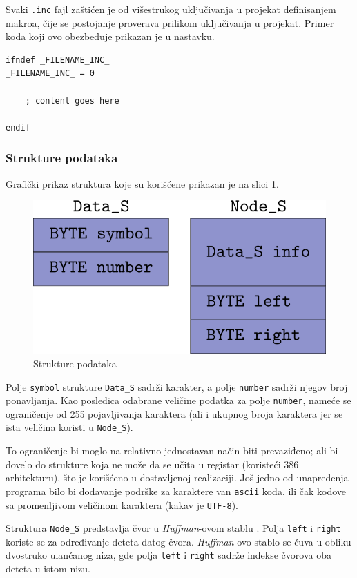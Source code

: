 \documentclass[a4paper, 12pt]{article}
\newcommand{\Huff}{\emph{Huffman}}
\begin{document}
Svaki \verb|.inc| fajl zaštićen je od višestrukog uključivanja u projekat definisanjem makroa, čije se postojanje proverava prilikom uključivanja u projekat.
Primer koda koji ovo obezbeđuje prikazan je u nastavku.

\begin{verbatim}
ifndef _FILENAME_INC_
_FILENAME_INC_ = 0

	; content goes here
	
endif
\end{verbatim}

\subsubsection*{Strukture podataka}

Grafički prikaz struktura koje su korišćene prikazan je na slici \ref{struct}. 

\begin{figure}[h!]
\centering
\includegraphics[width=.5\textwidth]{structures}
\caption{Strukture podataka}
\label{struct}
\end{figure}

Polje \verb|symbol| strukture \verb|Data_S| sadrži karakter, a polje \verb|number| sadrži njegov broj ponavljanja. 
Kao posledica odabrane veličine podatka za polje \verb|number|, nameće se ograničenje od 255 pojavljivanja karaktera (ali i ukupnog broja karaktera jer se ista veličina koristi u \verb|Node_S|).

To ograničenje bi moglo na relativno jednostavan način biti prevaziđeno; ali bi dovelo do strukture koja ne može da se učita u registar (koristeći 386 arhitekturu), što je korišćeno u dostavljenoj realizaciji. Još jedno od unapređenja programa bilo bi dodavanje podrške za karaktere van \verb|ascii| koda, ili čak kodove sa promenljivom veličinom karaktera (kakav je \verb|UTF-8|).

Struktura \verb|Node_S| predstavlja čvor u \textit{Huffman}-ovom stablu . Polja \verb|left| i \verb|right| koriste se za određivanje deteta datog čvora. 
\Huff-ovo stablo se čuva u obliku dvostruko ulančanog niza, gde polja \verb|left| i \verb|right| sadrže indekse čvorova oba deteta u istom nizu.
\end{document}
